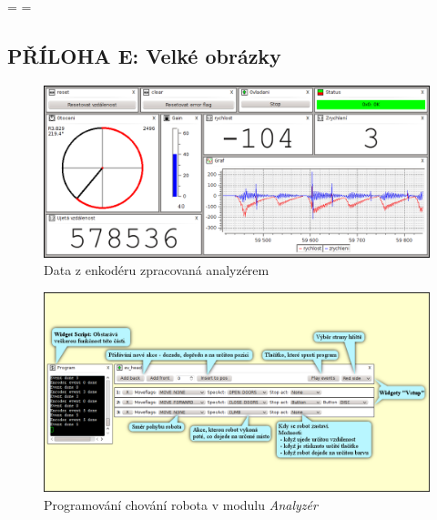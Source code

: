 \documentclass[12pt, a4paper, oneside]{article}
\newcommand{\It}{\textit}  %
\begin{document}
\newpage
\pagestyle{empty}
\textheight=\paperheight
\textwidth=\paperwidth
\voffset=-130pt
\begin{landscape}

\begin{center}
\section*{PŘÍLOHA E: Velké obrázky}
\end{center}

\begin{figure}[h]
\begin{center}
\includegraphics{img/enc_full.png}
\caption{Data z enkodéru zpracovaná analyzérem}
\label{analyzer_all}
\end{center}
\end{figure}

\newpage
\begin{figure}[h]
\begin{center}
\includegraphics[width=750pt]{img/control_david.png}
\caption{Programování chování robota v modulu \It{Analyzér}}
\label{david_ctrl}
\end{center}
\end{figure}
\end{landscape}
\end{document}
